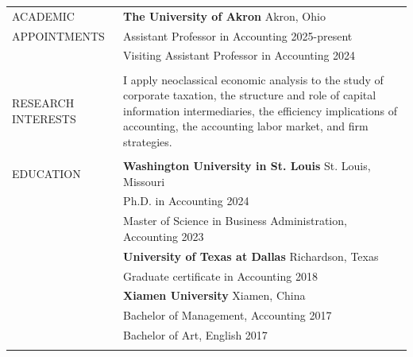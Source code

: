 \documentclass[letterpaper, 11pt]{article}
\begin{document}
\begin{longtable}{p{1.15in}p{5.05in}}

\textcolor{internationalkleinblue}{ACADEMIC} & \textbf{The University of Akron} \hfill Akron, Ohio \\ 
\textcolor{internationalkleinblue}{APPOINTMENTS} & Assistant Professor in Accounting \hfill 2025-present \\ 
& Visiting Assistant Professor in Accounting \hfill 2024 \\ \\



\nohyphens{\textcolor{internationalkleinblue}{RESEARCH INTERESTS}} & I apply neoclassical economic analysis to the study of corporate taxation, the structure and role of capital information intermediaries, the efficiency implications of accounting, the accounting labor market, and firm strategies.\\
& \\


\textcolor{internationalkleinblue}{EDUCATION} & \textbf{Washington University in St. Louis} \hfill St. Louis, Missouri \\ 
& Ph.D. in Accounting \hfill 2024 \\
& Master of Science in Business Administration, Accounting  \hfill 2023 \\

& \textbf{University of Texas at Dallas} \hfill Richardson, Texas \\
& Graduate certificate in Accounting \hfill 2018\\

& \textbf{Xiamen University} \hfill Xiamen, China\\
& Bachelor of Management, Accounting \hfill 2017\\
& Bachelor of Art, English \hfill 2017 \\
& \\



\end{longtable}
\end{document}
